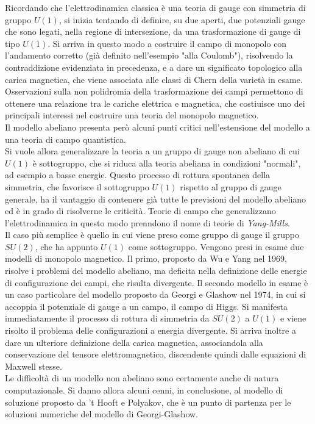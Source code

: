 Ricordando che l'elettrodinamica classica è una teoria di gauge con simmetria
di gruppo $U(1)$, si inizia tentando di definire, su due aperti, due potenziali
gauge che sono legati, nella regione di intersezione, da una trasformazione di
gauge di tipo $U(1)$. Si arriva in questo modo a costruire il campo di monopolo
con l'andamento corretto (già definito nell'esempio "alla Coulomb"), risolvendo
la contraddizione evidenziata in precedenza, e a dare un significato topologico
alla carica magnetica, che viene associata alle classi di Chern della varietà
in esame.
Osservazioni sulla non polidromia della trasformazione dei campi permettono di
ottenere una relazione tra le cariche elettrica e magnetica, che costiuisce
uno dei principali interessi nel costruire una teoria del monopolo magnetico.\\
Il modello abeliano presenta però alcuni punti critici nell'estensione
del modello a una teoria di campo quantistica.\\

Si vuole allora generalizzare la teoria a un gruppo di gauge non abeliano di cui
$U(1)$ è sottogruppo, che si riduca alla teoria abeliana in condizioni "normali",
ad esempio a basse energie.
Questo processo di rottura spontanea della simmetria, che
favorisce il sottogruppo $U(1)$ rispetto al gruppo di gauge generale, ha il
vantaggio di contenere già tutte le previsioni del modello abeliano ed è
in grado di risolverne le criticità. Teorie di campo che generalizzano
l'elettrodinamica in questo modo prenndono il nome di teorie di \emph{Yang-Mills}.\\
Il caso più semplice è quello in cui viene preso come gruppo di gauge il gruppo
$SU(2)$, che ha appunto $U(1)$ come sottogruppo.
Vengono presi in esame due modelli di monopolo magnetico.
Il primo, proposto da Wu e Yang nel 1969, risolve i problemi del modello abeliano,
ma deficita nella definizione delle energie di configurazione dei campi, che
risulta divergente.
Il secondo modello in esame è un caso
particolare del modello proposto da Georgi e Glashow nel 1974, in cui
si accoppia il potenziale di gauge a un campo, il campo di Higgs. Si manifesta
immediatamente il processo di rottura di simmetria da $SU(2)$ a $U(1)$ e viene
risolto il problema delle configurazioni a energia divergente. Si arriva inoltre
a dare un ulteriore definizione della carica magnetica, associandola alla
conservazione del tensore elettromagnetico, discendente quindi dalle equazioni di
Maxwell stesse.\\

Le difficoltà di un modello non abeliano sono certamente anche di natura
computazionale. Si danno allora alcuni cenni, in conclusione, al modello di
soluzione proposto da 't Hooft e Polyakov, che è un punto di partenza per le
soluzioni numeriche del modello di Georgi-Glashow.


